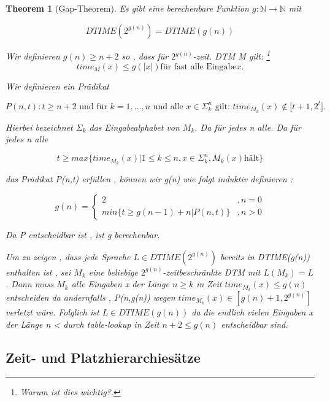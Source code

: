 \documentclass{article}
\newtheorem{theorem}{Theorem}
\begin{document}
	\begin{theorem}[Gap-Theorem]
		Es gibt eine berechenbare Funktion $g:\mathbb{N} \rightarrow \mathbb{N}$ mit

		\[
			DTIME(2^{g(n)}) = DTIME(g(n))
		\]

		
		Wir definieren $g(n) \geq n+2$ so , dass für $2^{g(n)}$-zeit. DTM M gilt: \footnote{Warum ist dies wichtig?.}
		\[ 
			time_M(x) \leq g(|x|) \textrm{für fast alle Eingabe} x. 
		\]

		Wir definieren ein Prädikat

		\[
			P(n,t) : t \geq n+2 \text{ und für } k= 1, \dots , n \text{ und alle } x \in \Sigma_k^n \text{ gilt: }
			time_{M_k}(x) \notin \lbrack t+1 , 2^t \rbrack.
		\]
		
		
		Hierbei bezeichnet $\Sigma_k $ das Eingabealphabet von $M_k$. Da für jedes n alle. Da für jedes n alle

		\[
			t \geq max \{ time_{M_k}(x) | 1 \leq k \leq n , x \in \Sigma_k^n , M_k(x)  \textrm{hält} \}
		\]

		das Prädikat P(n,t) erfüllen , können wir g(n) wie folgt induktiv definieren :

			\[ 
				g(n) = 
					\begin{cases}
						2 &, n=0 \\
						min\{ t \geq g(n-1) + n | P(n,t) \} &, n > 0 
					\end{cases} 
			\]

		Da P entscheidbar ist , ist g berechenbar.

		Um zu zeigen , dass jede Sprache $ L \in DTIME(2^{g(n)})$ bereits in DTIME(g(n)) enthalten ist , sei
		$M_k$ eine beliebige $2^{g(n)}$-zeitbeschränkte DTM mit $L(M_k) = L$. Dann muss $M_k$ alle Eingaben x der Länge $n \geq k $ in Zeit $time_{M_k}(x)\leq g(n)$ entscheiden da andernfalls , P(n,g(n)) wegen $time_{M_k}(x) \in [g(n) + 1 , 2^{g(n)}] $ verletzt wäre. Folglich ist $L \in DTIME(g(n))$ da die endlich vielen Eingaben x der Länge n < durch table-lookup in Zeit $n+2 \leq g(n)$ entscheidbar sind.

	\end{theorem}
	
	\subsection{Zeit- und Platzhierarchiesätze}
	
\end{document}

